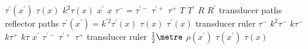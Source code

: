 \documentclass[10pt]{/home/tom/thesis/mythesis}
\begin{document}
\mpxshipout%
$\tau^\prime(x^\prime)$\stopmpxshipout
\mpxshipout%
$\tau(x)$\stopmpxshipout
\mpxshipout%
$k^2\tau(x)$\stopmpxshipout
\mpxshipout%
$x^\prime$\stopmpxshipout
\mpxshipout%
$x$\stopmpxshipout
\mpxshipout%
$\tau^{-} = \tau^{\prime-}$\stopmpxshipout
\mpxshipout%
$\tau^{\prime+}$\stopmpxshipout
\mpxshipout%
$\tau^{+}$\stopmpxshipout
\mpxshipout%
$T$\stopmpxshipout
\mpxshipout%
$T^\prime$\stopmpxshipout
\mpxshipout%
$R$\stopmpxshipout
\mpxshipout%
$R^\prime$\stopmpxshipout
\mpxshipout%
transducer paths\stopmpxshipout
\mpxshipout%
reflector paths\stopmpxshipout
\mpxshipout%
$\tau^\prime(x^\prime) = k^{\prime 2} \tau^\prime(x)$\stopmpxshipout
\mpxshipout%
$\tau(x)$\stopmpxshipout
\mpxshipout%
$\tau^\prime(x) $\stopmpxshipout
\mpxshipout%
transducer\stopmpxshipout
\mpxshipout%
ruler\stopmpxshipout
\mpxshipout%
$\tau^{-}$\stopmpxshipout
\mpxshipout%
$k^2 \tau^{-}$\stopmpxshipout
\mpxshipout%
$k \tau^{-}$\stopmpxshipout
\mpxshipout%
$k\tau^{+}$\stopmpxshipout
\mpxshipout%
$k\tau$\stopmpxshipout
\mpxshipout%
$x^\prime$\stopmpxshipout
\mpxshipout%
$\tau^{\prime-}$\stopmpxshipout
\mpxshipout%
$\tau^{\prime+}$\stopmpxshipout
\mpxshipout%
$\tau^{+}$\stopmpxshipout
\mpxshipout%
{transducer}\stopmpxshipout
\mpxshipout%
ruler\stopmpxshipout
\mpxshipout%
$\tfrac{1}{2}\metre$\stopmpxshipout
\mpxshipout%
$\rho(x^\prime)$\stopmpxshipout
\mpxshipout%
$\tau(x^\prime)$\stopmpxshipout
\mpxshipout%
$\tau(x)$\stopmpxshipout
\end{document}
